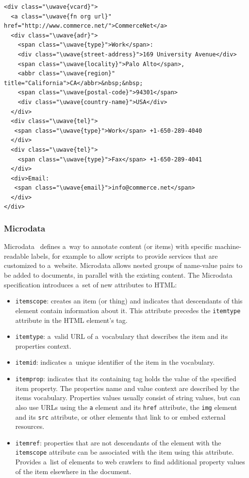 \begin{lstlisting}[caption={[Sample code snippet with embedded hCard Microformat mark-up.]{Sample code snippet with embedded \texttt{hCard} \uwave{Microformat} mark-up. Source: \url{http://microformats.org/wiki/hcard}}},label={code:microformats}]
<div class="\uwave{vcard}">
  <a class="\uwave{fn org url}" href="http://www.commerce.net/">CommerceNet</a>
  <div class="\uwave{adr}">
    <span class="\uwave{type}">Work</span>:
    <div class="\uwave{street-address}">169 University Avenue</div>
    <span class="\uwave{locality}">Palo Alto</span>,  
    <abbr class="\uwave{region}" title="California">CA</abbr>&nbsp;&nbsp;
    <span class="\uwave{postal-code}">94301</span>
    <div class="\uwave{country-name}">USA</div>
  </div>
  <div class="\uwave{tel}">
   <span class="\uwave{type}">Work</span> +1-650-289-4040
  </div>
  <div class="\uwave{tel}">
    <span class="\uwave{type}">Fax</span> +1-650-289-4041
  </div>
  <div>Email: 
   <span class="\uwave{email}">info@commerce.net</span>
  </div>
</div>
\end{lstlisting}

\subsubsection{Microdata}
Microdata~\cite{Hickson2010} defines a~way to annotate content (or items) with specific machine-readable labels,
for example to allow scripts to provide services that are customized to a~website.
Microdata allows nested groups of name-value pairs to be added to documents,
in parallel with the existing content.
The Microdata specification introduces a~set of new attributes to HTML:

\begin{itemize}
\item \texttt{itemscope}: creates an item (or thing) and indicates that descendants of this element contain information about it. This attribute precedes the \texttt{itemtype} attribute in the HTML element's tag.
\item \texttt{itemtype}: a~valid URL of a~vocabulary that describes the item and its properties context.
\item \texttt{itemid}: indicates a~unique identifier of the item in the vocabulary.
\item \texttt{itemprop}: indicates that its containing tag holds the value of the specified item property. The properties name and value context are described by the items vocabulary. Properties values usually consist of string values, but can also use URLs using the \texttt{a} element and its \texttt{href} attribute, the \texttt{img} element and its \texttt{src} attribute, or other elements that link to or embed external resources.
\item \texttt{itemref}: properties that are not descendants of the element with the \texttt{itemscope} attribute can be associated with the item using this attribute. Provides a~list of elements to web crawlers to find additional property values of the item elsewhere in the document.
\end{itemize}

